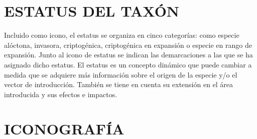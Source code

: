\documentclass{article}
\begin{document}
\section*{\normalsize{ESTATUS  DEL TAXÓN}}
Incluido como icono, el estatus se organiza en cinco categorías: como especie alóctona,  invasora, criptogénica, criptogénica en expansión o especie en rango de expansión. Junto al icono de estatus se indican las demarcaciones a las que se ha asignado dicho estatus.
El estatus es un concepto dinámico que puede cambiar a medida que se adquiere más información sobre el origen de la especie y/o el vector de introducción. También se tiene en cuenta su extensión en el área introducida y sus efectos e impactos.

\section*{\normalsize{ICONOGRAFÍA}}
\end{document}
